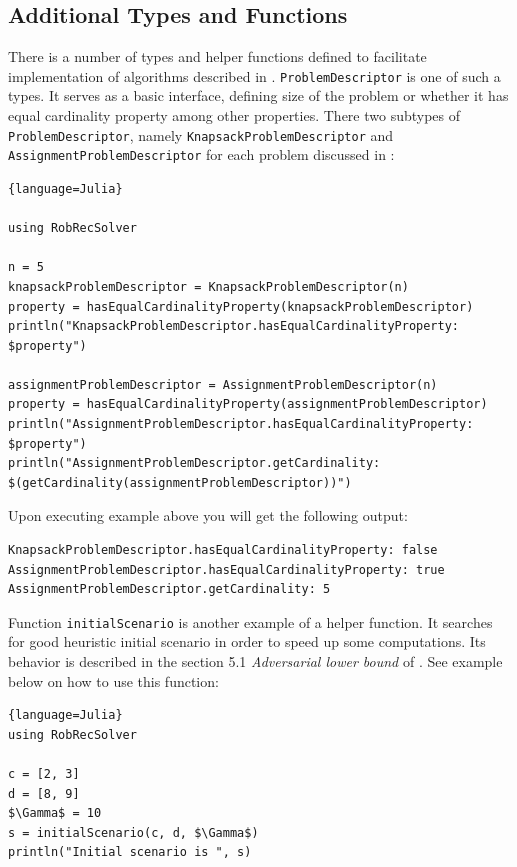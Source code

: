 \subsection{Additional Types and Functions}
There is a number of types and helper functions defined to facilitate implementation of algorithms described in \cite{DBLP:journals/corr/abs-1811-06719}. \texttt{ProblemDescriptor} is one of such a types. It serves as a basic interface, defining size of the problem or whether it has equal cardinality property among other properties. There two subtypes of \texttt{ProblemDescriptor}, namely \texttt{KnapsackProblemDescriptor} and \texttt{AssignmentProblemDescriptor} for each problem discussed in \cite{DBLP:journals/corr/abs-1811-06719}:
\begin{lstlisting}{language=Julia}

using RobRecSolver

n = 5
knapsackProblemDescriptor = KnapsackProblemDescriptor(n)
property = hasEqualCardinalityProperty(knapsackProblemDescriptor)
println("KnapsackProblemDescriptor.hasEqualCardinalityProperty: $property")

assignmentProblemDescriptor = AssignmentProblemDescriptor(n)
property = hasEqualCardinalityProperty(assignmentProblemDescriptor)
println("AssignmentProblemDescriptor.hasEqualCardinalityProperty: $property")
println("AssignmentProblemDescriptor.getCardinality: $(getCardinality(assignmentProblemDescriptor))")

\end{lstlisting}
Upon executing example above you will get the following output:
\begin{lstlisting}
KnapsackProblemDescriptor.hasEqualCardinalityProperty: false
AssignmentProblemDescriptor.hasEqualCardinalityProperty: true
AssignmentProblemDescriptor.getCardinality: 5
\end{lstlisting}

Function \texttt{initialScenario} is another example of a helper function. It searches for good heuristic initial scenario in order to speed up some computations. Its behavior is described in the section 5.1 \textit{Adversarial lower bound} of \cite{DBLP:journals/corr/abs-1811-06719}. See example below on how to use this function:
\begin{lstlisting}[mathescape]{language=Julia}
using RobRecSolver

c = [2, 3]
d = [8, 9]
$\Gamma$ = 10
s = initialScenario(c, d, $\Gamma$)
println("Initial scenario is ", s)
\end{lstlisting}

